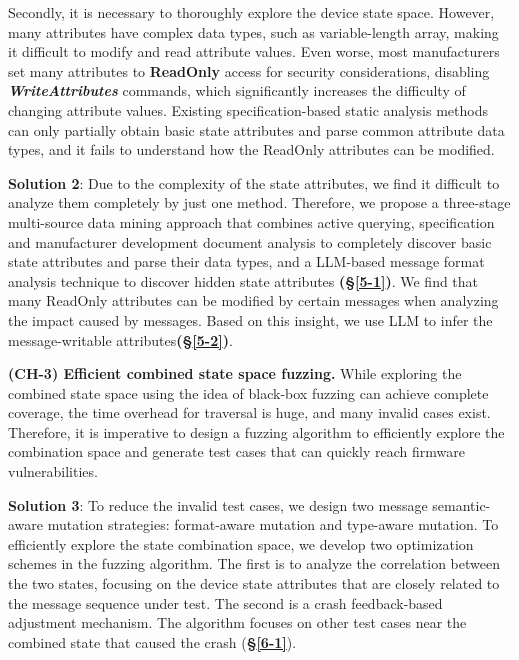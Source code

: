 \documentclass[10pt,journal,compsoc]{IEEEtran}
\begin{document}
Secondly, it is necessary to thoroughly explore the device state space. However, many attributes have complex data types, such as variable-length array, making it difficult to modify and read attribute values. Even worse, most manufacturers set many attributes to \textbf{ReadOnly} access for security considerations, disabling \textbf{\textit{WriteAttributes}} commands, which significantly increases the difficulty of changing attribute values. Existing specification-based static analysis methods \cite{ma2023no} can only partially obtain basic state attributes and parse common attribute data types, and it fails to understand how the ReadOnly attributes can be modified.\vspace{0.1cm}

\noindent \checkmark \; \textbf{Solution 2}: Due to the complexity of the state attributes, we find it difficult to analyze them completely by just one method. Therefore, we propose a three-stage multi-source data mining approach that combines active querying, specification and manufacturer development document analysis to completely discover basic state attributes and parse their data types, and a LLM-based message format analysis technique to discover hidden state attributes \textbf{(\S\ref{5-1})}. We find that many ReadOnly attributes can be modified by certain messages when analyzing the impact caused by messages. Based on this insight, we use LLM to infer the message-writable attributes\textbf{(\S\ref{5-2})}. \\ \vspace{-0.2cm}

\noindent \textbf{(CH-3) Efficient combined state space fuzzing.} While exploring the combined state space using the idea of black-box fuzzing \cite{ma2023no} can achieve complete coverage, the time overhead for traversal is huge, and many invalid cases exist. Therefore, it is imperative to design a fuzzing algorithm to efficiently explore the combination space and generate test cases that can quickly reach firmware vulnerabilities.\vspace{0.1cm}

\noindent \checkmark \; \textbf{Solution 3}: To reduce the invalid test cases, we design two message semantic-aware mutation strategies: format-aware mutation and type-aware mutation. To efficiently explore the state combination space, we develop two optimization schemes in the fuzzing algorithm. The first is to analyze the correlation between the two states, focusing on the device state attributes that are closely related to the message sequence under test. The second is a crash feedback-based adjustment mechanism. The algorithm focuses on other test cases near the combined state that caused the crash (\textbf{\S\ref{6-1}}).
\end{document}
